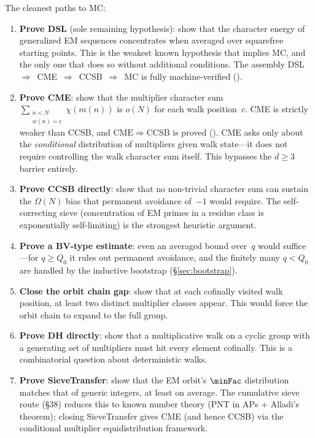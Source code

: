 The cleanest paths to MC:
\begin{enumerate}
\item \textbf{Prove DSL} (sole remaining hypothesis): show that the
  character energy of generalized EM sequences concentrates when averaged
  over squarefree starting points.  This is the weakest known hypothesis
  that implies MC, and the only one that does so without additional
  conditions.  The assembly
  DSL~$\Rightarrow$~CME~$\Rightarrow$~CCSB~$\Rightarrow$~MC is fully
  machine-verified ().

\item \textbf{Prove CME}: show that the multiplier
  character sum $\sum_{\substack{n < N \\ w(n) = c}} \chi(m(n))$ is
  $o(N)$ for each walk position~$c$.  CME is strictly weaker than
  CCSB, and $\mathrm{CME} \Rightarrow \mathrm{CCSB}$ is proved
  ().
  CME asks only about the \emph{conditional} distribution of
  multipliers given walk state---it does not require controlling the
  walk character sum itself.  This bypasses the $d \geq 3$ barrier
  entirely.

\item \textbf{Prove CCSB directly}: show that no non-trivial
  character sum can sustain the $\Omega(N)$ bias that permanent
  avoidance of~$-1$ would require.  The self-correcting sieve
  (concentration of EM primes in a residue class is exponentially
  self-limiting) is the strongest heuristic argument.

\item \textbf{Prove a BV-type estimate}: even an averaged bound
  over~$q$ would suffice---for $q \geq Q_0$ it rules out permanent
  avoidance, and the finitely many $q < Q_0$ are handled by the
  inductive bootstrap (\S\ref{sec:bootstrap}).

\item \textbf{Close the orbit chain gap}: show that at each cofinally
  visited walk position, at least two distinct multiplier classes
  appear.  This would force the orbit chain to expand to the full group.

\item \textbf{Prove DH directly}: show that a multiplicative walk
  on a cyclic group with a generating set of multipliers must hit
  every element cofinally.  This is a combinatorial question about
  deterministic walks.

\item \textbf{Prove SieveTransfer}: show that the EM orbit's $\minFac$
  distribution matches that of generic integers, at least on average.
  The cumulative sieve route (\S38) reduces this to known number theory
  (PNT in APs + Alladi's theorem); closing SieveTransfer gives CME
  (and hence CCSB) via the conditional multiplier equidistribution
  framework.


\end{enumerate}
